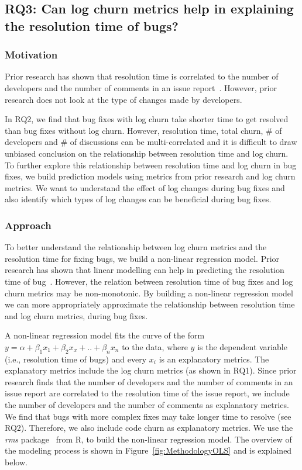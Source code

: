 \subsection* {\textbf{RQ3: Can log churn metrics help in explaining the resolution time of bugs?} }

\subsubsection*{\textbf{Motivation}}
Prior research has shown that resolution time is correlated to the number of developers and the number of comments in an issue report~\cite{RTpredictions}. However, prior research does not look at the type of changes made by developers. 

In RQ2, we find that bug fixes with log churn take shorter time to get resolved than bug fixes without log churn. However, resolution time, total churn, \# of developers and \# of discussions can be multi-correlated and it is difficult to draw unbiased conclusion on the relationship between resolution time and log churn. To further explore this relationship between resolution time and log churn in bug fixes, we build prediction models using metrics from prior research and log churn metrics. We want to understand the effect of log changes during bug fixes and also identify which types of log changes can be beneficial during bug fixes. 

\subsubsection*{\textbf{Approach}}

To better understand the relationship between log churn metrics and the resolution time for fixing bugs, we build a non-linear regression model. Prior research has shown that linear modelling can help in predicting the resolution time of bug~\cite{anbalagan2009predicting}. However, the relation between resolution time of bug fixes and log churn metrics may be non-monotonic. By building a non-linear regression model we can more appropriately approximate the relationship between resolution time and log churn metrics, during bug fixes.

  A non-linear regression model fits the curve of the form $y = \alpha + \beta_{1}x_{1} + \beta_{2}x_{x} + .. + \beta_{n}x_{n} $ to the data, where $y$ is the dependent variable (i.e., resolution time of bugs) and every $x_{i}$ is an explanatory metrics. The explanatory metrics include the log churn metrics (as shown in RQ1). Since prior research finds that the number of developers and the number of comments in an issue report are correlated to the resolution time of the issue report, we include the number of developers and the number of comments as explanatory metrics. We find that bugs with more complex fixes may take longer time to resolve (see RQ2). Therefore, we also include code churn as explanatory metrics. We use the \textsl{rms} package~\cite{rmsPackage} from R, to build the non-linear regression model. The overview of the modeling process is shown in Figure~\ref{fig:MethodologyOLS} and is explained below.




